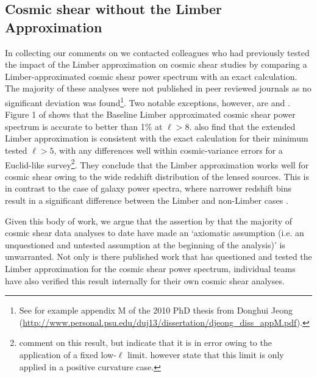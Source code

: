  \subsection{Cosmic shear without the Limber Approximation}
In collecting our comments on \citet{kitching/etal:2016} we contacted colleagues who had previously tested the impact of the Limber approximation on cosmic shear studies by comparing a Limber-approximated cosmic shear power spectrum with an exact calculation.  The majority of these analyses were not published in peer reviewed journals as no significant deviation was found\footnote{See for example appendix M of the 2010 PhD thesis from Donghui Jeong (\url{http://www.personal.psu.edu/duj13/dissertation/djeong_diss_appM.pdf}).}.  Two notable exceptions, however, are \citet{giannantonio/etal:2012} and \citet{bernardeau/etal:2012}.  Figure 1 of \citet{bernardeau/etal:2012} shows that the Baseline Limber approximated cosmic shear power spectrum is accurate to better than 1\% at $\ell > 8$.  \citet{giannantonio/etal:2012} also find that the extended Limber approximation is consistent with the exact calculation for their minimum tested $\ell>5$, with any differences well within cosmic-variance errors for a Euclid-like survey\footnote{\citet{kitching/etal:2016} comment on this result, but indicate that it is in error owing to the application of a fixed low-$\ell$ limit.  \citet{giannantonio/etal:2012} however state that this limit is only applied in a positive curvature case.}.  They conclude that the Limber approximation works well for cosmic shear owing to the wide redshift distribution of the lensed sources.  This is in contrast to the case of galaxy power spectra,  where narrower redshift bins result in a significant difference between the Limber and non-Limber cases \citep[see also][]{simon/2007}.   

Given this body of work, we argue that the assertion by \citet{kitching/etal:2016} that the majority of cosmic shear data analyses to date have made an `axiomatic assumption (i.e. an unquestioned and untested assumption at the beginning of the analysis)'  is unwarranted.  Not only is there published work that has questioned and tested the Limber approximation for the cosmic shear power spectrum, individual teams have also verified this result internally for their own cosmic shear analyses.    

